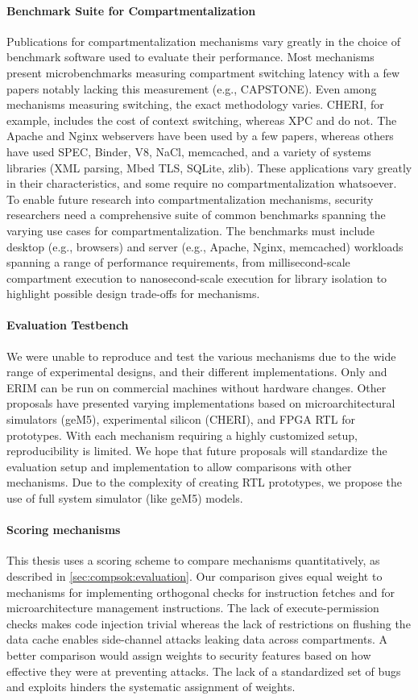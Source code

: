 \paragraph{Benchmark Suite for Compartmentalization}
Publications for compartmentalization mechanisms vary greatly in the
choice of benchmark software used to evaluate their performance.
Most mechanisms present microbenchmarks measuring compartment switching 
latency with a few papers notably lacking this measurement (e.g., CAPSTONE).
Even among mechanisms measuring switching, the exact methodology varies.
CHERI, for example, includes the cost of context switching, whereas XPC and
\seccells do not.
The Apache and Nginx webservers have been used by a few 
papers, whereas others have used SPEC, Binder, V8, NaCl, memcached, and a 
variety of systems libraries (XML parsing, Mbed TLS, SQLite, zlib).
These applications vary greatly in their characteristics, and some require
no compartmentalization whatsoever.
To enable future research into compartmentalization mechanisms, 
security researchers need a comprehensive suite of common benchmarks
spanning the varying use cases for compartmentalization.
The benchmarks must include desktop (e.g., browsers) and 
server (e.g., Apache, Nginx, memcached) workloads spanning a range of
performance requirements, from millisecond-scale compartment execution to
nanosecond-scale execution for library isolation to highlight possible 
design trade-offs for mechanisms.

\paragraph{Evaluation Testbench}
We were unable to reproduce and test the various mechanisms due to the
wide range of experimental designs, and their different implementations.
Only \lwc and ERIM can be run on commercial machines without hardware changes.
Other proposals have presented varying implementations based on
microarchitectural simulators (geM5), experimental silicon (CHERI), and
FPGA RTL for prototypes.
With each mechanism requiring a highly customized setup, reproducibility is
limited.
We hope that future proposals will standardize the evaluation setup and 
implementation to allow comparisons with other mechanisms.
Due to the complexity of creating RTL prototypes, we propose the use of 
full system simulator (like geM5) models.

\paragraph{Scoring mechanisms}
This thesis uses a scoring scheme to compare mechanisms quantitatively, as
described in \autoref{sec:compsok:evaluation}. 
Our comparison gives equal weight to mechanisms for implementing
orthogonal checks for instruction fetches and for microarchitecture 
management instructions.
The lack of execute-permission checks makes code injection trivial whereas the
lack of restrictions on flushing the data cache enables side-channel attacks
leaking data across compartments. 
A better comparison would assign weights to security features based on how
effective they were at preventing attacks.
The lack of a standardized set of bugs and exploits hinders the systematic
assignment of weights.

